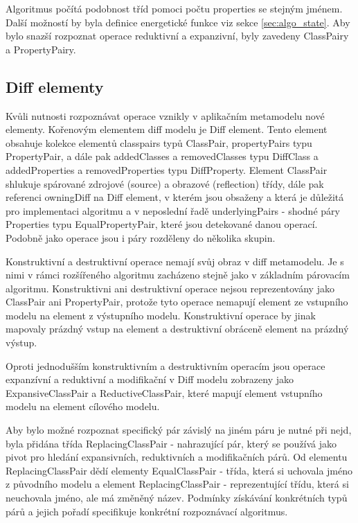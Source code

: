 \documentclass[11pt,twoside,a4paper]{book}
\begin{document}
 Algoritmus počítá podobnost tříd pomoci počtu properties se stejným jménem.
 Další možností by byla definice energetické funkce viz sekce
 \ref{sec:algo_state}. Aby bylo snazší rozpoznat operace reduktivní a
 expanzivní, byly zavedeny ClassPairy a PropertyPairy.
 
\subsection{Diff elementy}
 
 Kvůli nutnosti rozpoznávat operace vznikly v aplikačním metamodelu nové
 elementy. Kořenovým elementem diff modelu je Diff element. Tento element
 obsahuje kolekce elementů classpairs typů ClassPair, propertyPairs
 typu PropertyPair, a dále pak addedClasses a removedClasses typu DiffClass a
 addedProperties a removedProperties typu DiffProperty. Element ClassPair
 shlukuje spárované zdrojové (source) a obrazové (reflection) třídy, dále pak
 referenci owningDiff na Diff element, v kterém jsou obsaženy a která je
 důležitá pro implementaci algoritmu a v neposlední řadě underlyingPairs -
 shodné páry Properties typu EqualPropertyPair, které jsou detekované danou
 operací. Podobně jako operace jsou i páry rozděleny do několika skupin.
 
 Konstruktivní a destruktivní operace nemají svůj obraz v diff metamodelu. Je s
 nimi v rámci rozšířeného algoritmu zacházeno stejně jako v základním párovacím
 algoritmu.
 Konstruktivni ani destruktivní operace nejsou reprezentovány jako ClassPair ani
 PropertyPair, protože tyto operace nemapují element ze vstupního modelu na
 element z výstupního modelu.
 Konstruktivní operace by jinak mapovaly prázdný vstup na element a
 destruktivní obráceně element na prázdný výstup.
 
 Oproti jednodušším konstruktivním a destruktivním operacím jsou operace
 expanzívní a reduktivní a modifikační v Diff modelu zobrazeny jako
 ExpansiveClassPair a ReductiveClassPair, které mapují element
 vstupního modelu na element cílového modelu. 
 
 Aby bylo možné rozpoznat specifický pár závislý na jiném páru je nutné při
 nejd, byla přidána třída ReplacingClassPair - nahrazující pár, který se
 používá jako pivot pro hledání expansivních, reduktivních a modifikačních
 párů. Od elementu ReplacingClassPair dědí elementy EqualClassPair - třída,
 která si uchovala jméno z původního modelu a element ReplacingClassPair -
 reprezentující třídu, která si neuchovala jméno, ale má změněný název.
 Podmínky získávání konkrétních typů párů a jejich pořadí specifikuje konkrétní
 rozpoznávací algoritmus.
 
\end{document}
